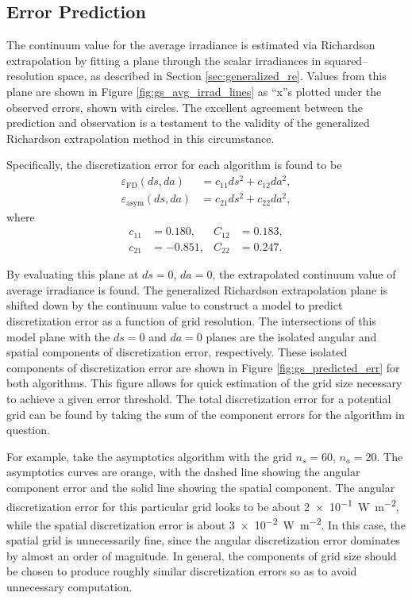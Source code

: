 \subsection{Error Prediction}
The continuum value for the average irradiance is estimated via Richardson extrapolation by fitting a plane through the scalar irradiances in squared--resolution space, as described in Section \ref{sec:generalized_re}.
Values from this plane are shown in Figure \ref{fig:gs_avg_irrad_lines} as ``x''s plotted under the observed errors, shown with circles.
The excellent agreement between the prediction and observation is a testament to the validity of the generalized Richardson extrapolation method in this circumstance.

Specifically, the discretization error for each algorithm is found to be
\begin{align}
  \varepsilon_{\mbox{FD}}(ds, da) &= c_{11} ds^2 + c_{12} da^2, \\
  \varepsilon_{\mbox{asym}}(ds, da) &= c_{21} ds^2 + c_{22} da^2,
\end{align}
where
\begin{align}
  c_{11} &= 0.180, & C_{12} &= 0.183, \\
  c_{21} &= -0.851, & C_{22} &= 0.247.
\end{align}

By evaluating this plane at $ds=0$, $da=0$, the extrapolated continuum value of average irradiance is found.
The generalized Richardson extrapolation plane is shifted down by the continuum value to construct a model to predict discretization error as a function of grid resolution.
The intersections of this model plane with the $ds=0$ and $da=0$ planes are the isolated angular and spatial components of discretization error, respectively.
These isolated components of discretization error are shown in Figure \ref{fig:gs_predicted_err} for both algorithms.
This figure allows for quick estimation of the grid size necessary to achieve a given error threshold.
The total discretization error for a potential grid can be found by taking the sum of the component errors for the algorithm in question.

For example, take the asymptotics algorithm with the grid $n_s=60$, $n_a=20$.
The asymptotics curves are orange, with the dashed line showing the angular component error and the solid line showing the spatial component.
The angular discretization error for this particular grid looks to be about \SI{2e-1}{\W\per\m\squared}, while the spatial discretization error is about \SI{3e-2}{\W\per\m\squared}.
In this case, the spatial grid is unnecessarily fine, since the angular discretization error dominates by almost an order of magnitude.
In general, the components of grid size should be chosen to produce roughly similar discretization errors so as to avoid unnecessary computation.

